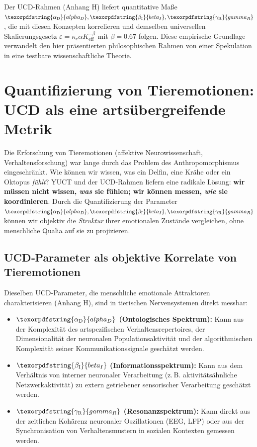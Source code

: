 \documentclass[12pt,a4paper]{article}
\DeclareRobustCommand{\alD}{\texorpdfstring{\ensuremath{\alpha_{\mathrm{D}}}}{alpha_D}}
\DeclareRobustCommand{\beI}{\texorpdfstring{\ensuremath{\beta_{\mathrm{I}}}}{beta_I}}
\DeclareRobustCommand{\gaR}{\texorpdfstring{\ensuremath{\gamma_{\mathrm{R}}}}{gamma_R}}
\newcommand{\eff}{\mathrm{eff}}
\newcommand{\Ke}{K_{\eff}}
\begin{document}
	Der UCD‑Rahmen (Anhang H) liefert quantitative Maße \(\alD, \beI, \gaR\), die mit diesen Konzepten korrelieren und demselben universellen Skalierungsgesetz \(\varepsilon = \kappa_c \alpha \Ke^{-\beta}\) mit \(\beta = 0.67\) folgen. Diese empirische Grundlage verwandelt den hier präsentierten philosophischen Rahmen von einer Spekulation in eine testbare wissenschaftliche Theorie.
	
	\section{Quantifizierung von Tieremotionen: UCD als eine artsübergreifende Metrik}
	
	Die Erforschung von Tieremotionen (affektive Neurowissenschaft, Verhaltensforschung) war lange durch das Problem des Anthropomorphismus eingeschränkt. Wie können wir wissen, was ein Delfin, eine Krähe oder ein Oktopus \textit{fühlt}? YUCT und der UCD‑Rahmen liefern eine radikale Lösung: \textbf{wir müssen nicht wissen, \textit{was} sie fühlen; wir können messen, \textit{wie} sie koordinieren}. Durch die Quantifizierung der Parameter \(\alD, \beI, \gaR\) können wir objektiv die \textit{Struktur} ihrer emotionalen Zustände vergleichen, ohne menschliche Qualia auf sie zu projizieren.
	
	\subsection{UCD‑Parameter als objektive Korrelate von Tieremotionen}
	
	Dieselben UCD‑Parameter, die menschliche emotionale Attraktoren charakterisieren (Anhang H), sind in tierischen Nervensystemen direkt messbar:
	
	\begin{itemize}
		\item \textbf{\(\alD\) (Ontologisches Spektrum):} Kann aus der Komplexität des artspezifischen Verhaltensrepertoires, der Dimensionalität der neuronalen Populationsaktivität und der algorithmischen Komplexität seiner Kommunikationssignale geschätzt werden.
		\item \textbf{\(\beI\) (Informationsspektrum):} Kann aus dem Verhältnis von interner neuronaler Verarbeitung (z. B. aktivitätsähnliche Netzwerkaktivität) zu extern getriebener sensorischer Verarbeitung geschätzt werden.
		\item \textbf{\(\gaR\) (Resonanzspektrum):} Kann direkt aus der zeitlichen Kohärenz neuronaler Oszillationen (EEG, LFP) oder aus der Synchronisation von Verhaltensmustern in sozialen Kontexten gemessen werden.
	\end{itemize}
	
\end{document}
